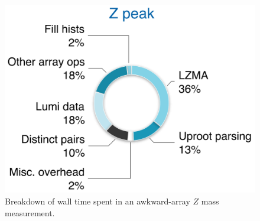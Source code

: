 \documentclass[a4paper]{jpconf}
\begin{document}
\begin{figure}
\begin{center}
\includegraphics[width=0.5\linewidth]{zpeak-performance-breakdown.png}
\end{center}

\caption{Breakdown of wall time spent in an awkward-array $Z$ mass measurement. \label{fig:zpeak}}
\end{figure}









\end{document}
